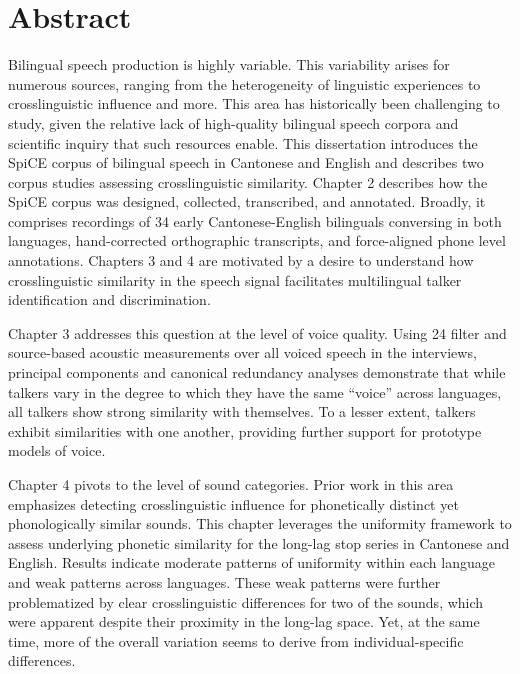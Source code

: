 
\chapter{Abstract}

Bilingual speech production is highly variable. This variability arises for numerous sources, ranging from the heterogeneity of linguistic experiences to crosslinguistic influence and more. This area has historically been challenging to study, given the relative lack of high-quality bilingual speech corpora and scientific inquiry that such resources enable. This dissertation introduces the SpiCE corpus of bilingual speech in Cantonese and English and describes two corpus studies assessing crosslinguistic similarity. Chapter 2 describes how the SpiCE corpus was designed, collected, transcribed, and annotated. Broadly, it comprises recordings of 34 early Cantonese-English bilinguals conversing in both languages, hand-corrected orthographic transcripts, and force-aligned phone level annotations. Chapters 3 and 4 are motivated by a desire to understand how crosslinguistic similarity in the speech signal facilitates multilingual talker identification and discrimination. 

Chapter 3 addresses this question at the level of voice quality. Using 24 filter and source-based acoustic measurements over all voiced speech in the interviews, principal components and canonical redundancy analyses demonstrate that while talkers vary in the degree to which they have the same ``voice'' across languages, all talkers show strong similarity with themselves. To a lesser extent, talkers exhibit similarities with one another, providing further support for prototype models of voice. 

Chapter 4 pivots to the level of sound categories. Prior work in this area emphasizes detecting crosslinguistic influence for phonetically distinct yet phonologically similar sounds. This chapter leverages the uniformity framework to assess underlying phonetic similarity for the long-lag stop series in Cantonese and English.  Results indicate moderate patterns of uniformity within each language and weak patterns across languages. These weak patterns were further problematized by clear crosslinguistic differences for two of the sounds, which were apparent despite their proximity in the long-lag space. Yet, at the same time, more of the overall variation seems to derive from individual-specific differences. 

